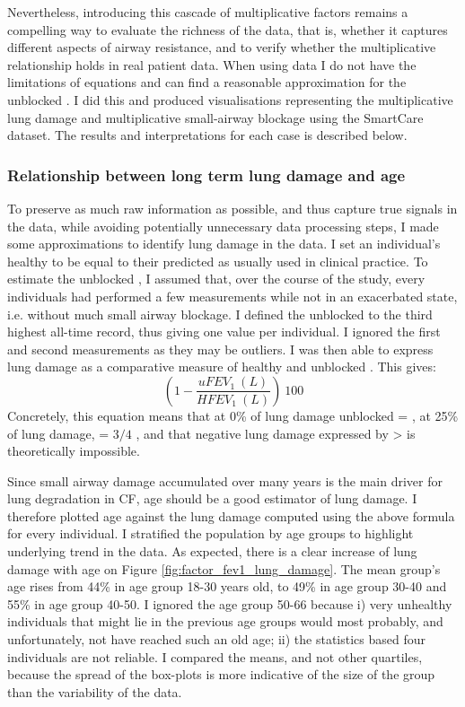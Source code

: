 Nevertheless, introducing this cascade of multiplicative factors remains a compelling way to evaluate the richness of the data, that is, whether it captures different aspects of airway resistance, and to verify whether the multiplicative relationship holds in real patient data. When using data I do not have the limitations of equations and can find a reasonable approximation for the unblocked \F. I did this and produced visualisations representing the multiplicative lung damage and multiplicative small-airway blockage using the SmartCare dataset. The results and interpretations for each case is described below.

\subsubsection{Relationship between long term lung damage and age}
To preserve as much raw information as possible, and thus capture true signals in the data, while avoiding potentially unnecessary data processing steps, I made some approximations to identify lung damage in the data. I set an individual's healthy \F to be equal to their predicted \F as usually used in clinical practice. To estimate the unblocked \F, I assumed that, over the course of the study, every individuals had performed a few \F measurements while not in an exacerbated state, i.e. without much small airway blockage. I defined the unblocked \F to the third highest all-time \F record, thus giving one value per individual. I ignored the first and second measurements as they may be outliers. I was then able to express lung damage as a comparative measure of healthy and unblocked \F. This gives:
\begin{equation}
    (1 - \frac{uF\!EV_1\ (L)}{H\!F\!EV_1\ (L)})\ 100
\end{equation}
Concretely, this equation means that at 0\% of lung damage unblocked \UF = \HF, at 25\% of lung damage, \UF = $3/4$ \HF, and that negative lung damage expressed by \UF > \HF is theoretically impossible.

Since small airway damage accumulated over many years is the main driver for lung degradation in CF, age should be a good estimator of lung damage. I therefore plotted age against the lung damage computed using the above formula for every individual. I stratified the population by age groups to highlight underlying trend in the data. As expected, there is a clear increase of lung damage with age on Figure \ref{fig:factor_fev1_lung_damage}. The mean group's age rises from 44\% in age group 18-30 years old, to 49\% in age group 30-40 and 55\% in age group 40-50. I ignored the age group 50-66 because i) very unhealthy individuals that might lie in the previous age groups would most probably, and unfortunately, not have reached such an old age; ii) the statistics based four individuals are not reliable. I compared the means, and not other quartiles, because the spread of the box-plots is more indicative of the size of the group than the variability of the data.

